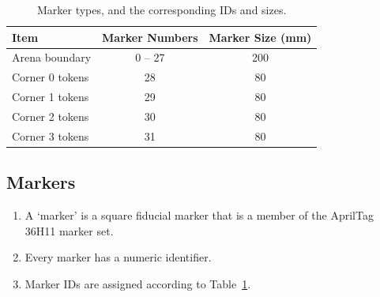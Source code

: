 \begin{table}[t]
      \centering
      \begin{tabular}{lcc}
            \toprule
            \textbf{Item} & \textbf{Marker Numbers} & \textbf{Marker Size (mm)} \\
            \midrule
            Arena boundary & {} 0 -- 27 & 200 \\
            Corner 0 tokens & 28 & 80 \\
            Corner 1 tokens & 29 & 80 \\
            Corner 2 tokens & 30 & 80 \\
            Corner 3 tokens & 31 & 80 \\
            \bottomrule
      \end{tabular}
      \caption{Marker types, and the corresponding IDs and sizes.}
      \label{tab:markers}
\end{table}

\subsection{Markers}
\label{spec:marker}

\begin{enumerate}
  \item A `marker' is a square fiducial marker that is a member of the AprilTag 36H11 marker set.
  \item Every marker has a numeric identifier.
  \item Marker IDs are assigned according to Table~\ref{tab:markers}.
\end{enumerate}
